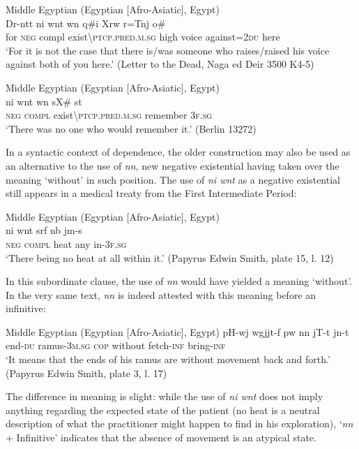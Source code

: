 \documentclass[output=paper]{langsci/langscibook}
\begin{document}
\ea Middle Egyptian (Egyptian [Afro-Asiatic], Egypt) \label{ex:AE47}\\
    \gll Dr-ntt ni wnt wn q\#i Xrw r=Tnj o\#\\  
    for \textsc{neg} compl   exist\textbackslash\textsc{ptcp.pred.m.sg} high voice against=\textsc{2du} here\\ 
    \glt ‘For it is not the case that there is/was someone who raises/raised his voice against both of you here.’ (Letter to the Dead, Naga ed Deir 3500 K4-5) 
\z
 
\ea Middle Egyptian (Egyptian [Afro-Asiatic], Egypt) \label{ex:AE48}\\
    \gll ni wnt wn sX\# st\\ 
    \textsc{neg} \textsc{compl} exist\textbackslash\textsc{ptcp.pred.m.sg} remember \textsc{3f.sg}\\ 
    \glt ‘There was no one who would remember it.’ (Berlin 13272) 
\z
 
In a syntactic context of dependence, the older construction may also be used as an alternative to the use of \textit{nn}, new negative existential having taken over the meaning ‘without’ in such position. The use of \textit{ni wnt} as a negative existential still appears in a medical treaty from the First Intermediate Period:  
 
\ea Middle Egyptian (Egyptian [Afro-Asiatic], Egypt) \label{ex:AE49}\\
    \gll ni wnt srf nb jm-s\\
    \textsc{neg} \textsc{compl} heat any in-\textsc{3f.sg}\\ 
    \glt ‘There being no heat at all within it.’ (Papyrus Edwin Smith, plate 15, l. 12) 
\z 
 
In this subordinate clause, the use of \textit{nn} would have yielded a meaning ‘without’. In the very same text, \textit{nn} is indeed attested with this meaning before an infinitive:  
 
\ea Middle Egyptian (Egyptian [Afro-Asiatic], Egypt) \label{ex:AE50}
    \gll pH-wj wgjjt-f pw nn jT-t jn-t\\
    end-\textsc{du} ramus-\textsc{3m.sg} \textsc{cop} without fetch-\textsc{inf} bring-\textsc{inf}\\ 
    \glt ‘It means that the ends of his ramus are without movement back and forth.’ (Papyrus Edwin Smith, plate 3, l. 17) 
\z {}
 
The difference in meaning is slight: while the use of \textit{ni wnt} does not imply anything regarding the expected state of the patient (no heat is a neutral description of what the practitioner might happen to find in his exploration), ‘\textit{nn} + Infinitive’ indicates that the absence of movement is an atypical state.  
\end{document}
